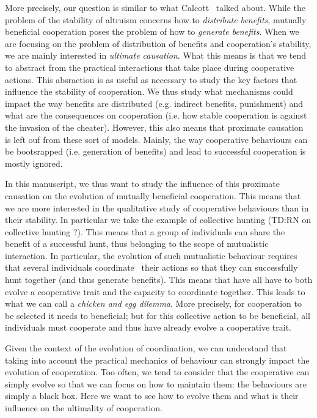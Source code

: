     More precisely, our question is similar to what Calcott~\parencite{Calcott2007a} talked about. While the problem of the stability of altruism concerns how to \emph{distribute benefits}, mutually beneficial cooperation poses the problem of how to \emph{generate benefits}. When we are focusing on the problem of distribution of benefits and cooperation's stability, we are mainly interested in \emph{ultimate causation}. What this means is that we tend to abstract from the practical interactions that take place during cooperative actions. This absraction is as useful as necessary to study the key factors that influence the stability of cooperation. We thus study what mechanisms could impact the way benefits are distributed (e.g. indirect benefits, punishment) and what are the consequences on cooperation (i.e. how stable cooperation is against the invasion of the cheater). However, this also means that proximate causation~\parencite{Tinbergen1963, West2007} is left ouf from these sort of models. Mainly, the way cooperative behaviours can be bootsrapped (i.e. generation of benefits) and lead to successful cooperation is mostly ignored.

    In this manuscript, we thus want to study the influence of this proximate causation on the evolution of mutually beneficial cooperation. This means that we are more interested in the qualitative study of cooperative behaviours than in their stability. In particular we take the example of collective hunting (TD:RN on collective hunting ?). This means that a group of individuals can share the benefit of a successful hunt, thus belonging to the scope of mutualistic interaction. In particular, the evolution of such mutualistic behaviour requires that several individuals coordinate~\parencite{Alvard2001, Alvard2003, Drea2009, Leimar2003} their actions so that they can successfully hunt together (and thus generate benefits). This means that have all have to both evolve a cooperative trait and the capacity to coordinate together. This leads to what we can call a \emph{chicken and egg dilemma}. More precisely, for cooperation to be selected it needs to beneficial; but for this collective action to be beneficial, all individuals must cooperate and thus have already evolve a cooperative trait.

    Given the context of the evolution of coordination, we can understand that taking into account the practical mechanics of behaviour can strongly impact the evolution of cooperation. Too often, we tend to consider that the cooperative can simply evolve so that we can focus on how to maintain them: the behaviours are simply a black box. Here we want to see how to evolve them and what is their influence on the ultimality of cooperation.

